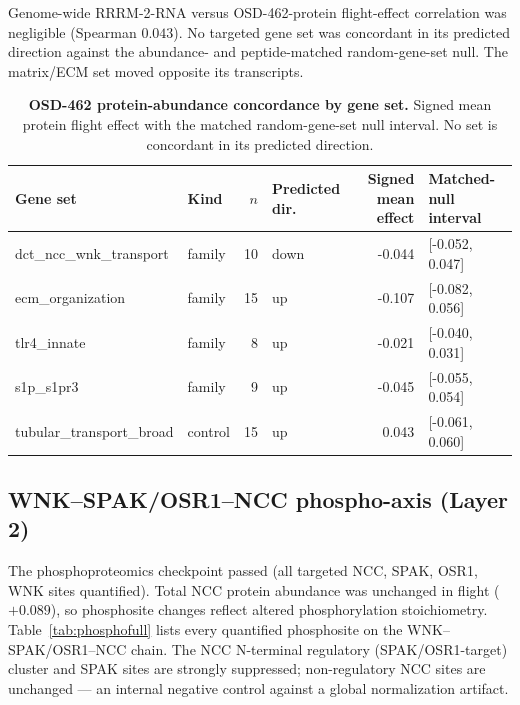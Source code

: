 \documentclass[10pt]{article}
\begin{document}
Genome-wide RRRM-2-RNA versus OSD-462-protein flight-effect correlation was negligible (Spearman $0.043$). No targeted gene set was concordant in its predicted direction against the abundance- and peptide-matched random-gene-set null. The matrix/ECM set moved opposite its transcripts.

\begin{table}[H]
\centering\small
\caption{\textbf{OSD-462 protein-abundance concordance by gene set.} Signed mean protein flight effect with the matched random-gene-set null interval. No set is concordant in its predicted direction.}
\label{tab:protconc}
\begin{tabular}{llrlrl}
\toprule
Gene set & Kind & $n$ & Predicted dir. & Signed mean effect & Matched-null interval \\
\midrule
dct\_ncc\_wnk\_transport & family & 10 & down & -0.044 & [-0.052, 0.047] \\
ecm\_organization & family & 15 & up & -0.107 & [-0.082, 0.056] \\
tlr4\_innate & family & 8 & up & -0.021 & [-0.040, 0.031] \\
s1p\_s1pr3 & family & 9 & up & -0.045 & [-0.055, 0.054] \\
tubular\_transport\_broad & control & 15 & up & 0.043 & [-0.061, 0.060] \\
\bottomrule
\end{tabular}
\end{table}

\subsection{WNK--SPAK/OSR1--NCC phospho-axis (Layer 2)}

The phosphoproteomics checkpoint passed (all targeted NCC, SPAK, OSR1, WNK sites quantified). Total NCC protein abundance was unchanged in flight ($+0.089$), so phosphosite changes reflect altered phosphorylation stoichiometry. Table~\ref{tab:phosphofull} lists every quantified phosphosite on the WNK--SPAK/OSR1--NCC chain. The NCC N-terminal regulatory (SPAK/OSR1-target) cluster and SPAK sites are strongly suppressed; non-regulatory NCC sites are unchanged --- an internal negative control against a global normalization artifact.
\end{document}

